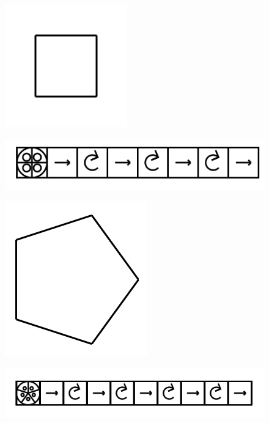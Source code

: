 \documentclass[11pt]{article}
\begin{document}
\begin{figure}
\includegraphics[scale=0.3]{image5.png}
\end{figure}
\begin{figure}
\includegraphics[scale=0.3]{image6.png}
\end{figure}

\begin{figure}
\includegraphics[scale=0.3]{image7.png}
\end{figure}
\begin{figure}
\includegraphics[scale=0.3]{image8.png}
\end{figure}
\end{document}
